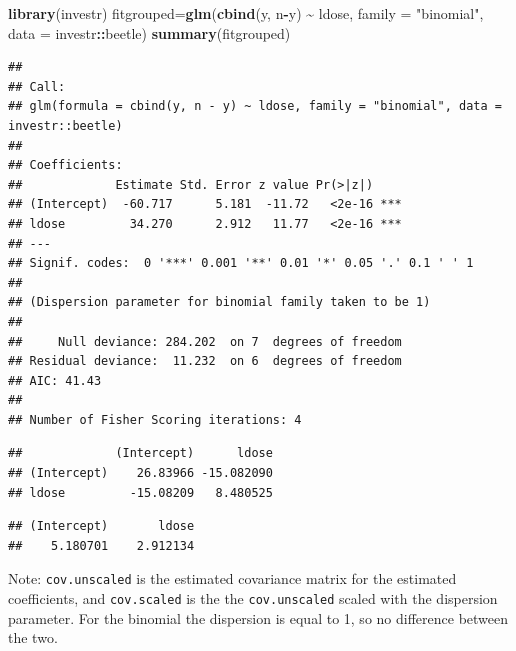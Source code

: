 \documentclass[
  ignorenonframetext,
]{beamer}
\newenvironment{Shaded}{\begin{snugshade}}{\end{snugshade}}
\newcommand{\AttributeTok}[1]{\textcolor[rgb]{0.13,0.29,0.53}{#1}}
\newcommand{\FunctionTok}[1]{\textcolor[rgb]{0.13,0.29,0.53}{\textbf{#1}}}
\newcommand{\NormalTok}[1]{#1}
\newcommand{\OtherTok}[1]{\textcolor[rgb]{0.56,0.35,0.01}{#1}}
\newcommand{\SpecialCharTok}[1]{\textcolor[rgb]{0.81,0.36,0.00}{\textbf{#1}}}
\newcommand{\StringTok}[1]{\textcolor[rgb]{0.31,0.60,0.02}{#1}}
\begin{document}
\begin{frame}[fragile]
\begin{Shaded}
\begin{Highlighting}[]
\FunctionTok{library}\NormalTok{(investr)}
\NormalTok{fitgrouped}\OtherTok{=}\FunctionTok{glm}\NormalTok{(}\FunctionTok{cbind}\NormalTok{(y, n}\SpecialCharTok{{-}}\NormalTok{y) }\SpecialCharTok{\textasciitilde{}}\NormalTok{ ldose, }\AttributeTok{family =} \StringTok{"binomial"}\NormalTok{, }\AttributeTok{data =}\NormalTok{ investr}\SpecialCharTok{::}\NormalTok{beetle) }
\FunctionTok{summary}\NormalTok{(fitgrouped)}
\end{Highlighting}
\end{Shaded}

\begin{verbatim}
## 
## Call:
## glm(formula = cbind(y, n - y) ~ ldose, family = "binomial", data = investr::beetle)
## 
## Coefficients:
##             Estimate Std. Error z value Pr(>|z|)    
## (Intercept)  -60.717      5.181  -11.72   <2e-16 ***
## ldose         34.270      2.912   11.77   <2e-16 ***
## ---
## Signif. codes:  0 '***' 0.001 '**' 0.01 '*' 0.05 '.' 0.1 ' ' 1
## 
## (Dispersion parameter for binomial family taken to be 1)
## 
##     Null deviance: 284.202  on 7  degrees of freedom
## Residual deviance:  11.232  on 6  degrees of freedom
## AIC: 41.43
## 
## Number of Fisher Scoring iterations: 4
\end{verbatim}

\begin{Shaded}
\end{Shaded}

\begin{verbatim}
##             (Intercept)      ldose
## (Intercept)    26.83966 -15.082090
## ldose         -15.08209   8.480525
\end{verbatim}

\begin{Shaded}
\end{Shaded}

\begin{verbatim}
## (Intercept)       ldose 
##    5.180701    2.912134
\end{verbatim}

Note: \texttt{cov.unscaled} is the estimated covariance matrix for the
estimated coefficients, and \texttt{cov.scaled} is the the
\texttt{cov.unscaled} scaled with the dispersion parameter. For the
binomial the dispersion is equal to 1, so no difference between the two.
\end{frame}
\end{document}
